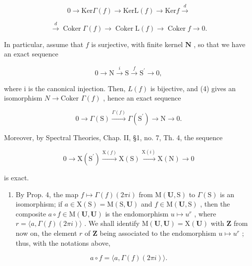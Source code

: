 \[
0 \longrightarrow \mathrm{Ker} \Gamma (f) \longrightarrow \mathrm{KerL} (f) \longrightarrow \mathrm{Ker} f \stackrel {d} {\longrightarrow}\tag{4}
\]

\[
\stackrel {{d}} {{\longrightarrow}} \operatorname{Coker} \Gamma (f) \longrightarrow \operatorname{Coker} \mathrm{L} (f) \longrightarrow \operatorname{Coker} f \longrightarrow 0.
\]

In particular, assume that \(f\) is surjective, with finite kernel \(\mathbf{N}\) , so that we have an exact sequence

\[
0 \longrightarrow \mathrm{N} \stackrel {i} {\longrightarrow} \mathrm{S} \stackrel {f} {\longrightarrow} \mathrm{S} ^ {\prime} \longrightarrow 0,
\]

where i is the canonical injection. Then, \(L(f)\) is bijective, and (4) gives an isomorphism \(N \to \text{Coker } \Gamma(f)\) , hence an exact sequence

\[
0 \longrightarrow \Gamma (\mathrm{S}) \stackrel {\Gamma (f)} {\longrightarrow} \Gamma (\mathrm{S} ^ {\prime}) \longrightarrow \mathrm{N} \longrightarrow 0.\tag{5}
\]

Moreover, by Spectral Theories, Chap. II, §1, no. 7, Th. 4, the sequence

\[
0 \longrightarrow \mathrm{X} (\mathrm{S} ^ {\prime}) \stackrel {{\mathrm{X} (f)}} {{\longrightarrow}} \mathrm{X} (\mathrm{S}) \stackrel {{\mathrm{X} (i)}} {{\longrightarrow}} \mathrm{X} (\mathrm{N}) \longrightarrow 0\tag{6}
\]

is exact.

\begin{enumerate}
\def\labelenumi{\arabic{enumi})}
\setcounter{enumi}{1}
\tightlist
\item
  By Prop. 4, the map \(f \mapsto \Gamma(f)(2\pi i)\) from \(\mathrm{M}(\mathbf{U},\mathrm{S})\) to \(\Gamma(\mathrm{S})\) is an isomorphism; if \(a \in \mathrm{X}(\mathrm{S}) = \mathrm{M}(\mathrm{S},\mathbf{U})\) and \(f \in \mathrm{M}(\mathbf{U},\mathrm{S})\) , then the composite \(a \circ f \in \mathrm{M}(\mathbf{U},\mathbf{U})\) is the endomorphism \(u \mapsto u^r\) , where \(r = \langle a,\Gamma(f)(2\pi i)\rangle\) . We shall identify \(\mathrm{M}(\mathbf{U},\mathbf{U}) = \mathrm{X}(\mathbf{U})\) with \(\mathbf{Z}\) from now on, the element \(r\) of \(\mathbf{Z}\) being associated to the endomorphism \(u \mapsto u^r\) ; thus, with the notations above,
\end{enumerate}

\[
a \circ f = \langle a, \Gamma (f) (2 \pi i) \rangle .
\]

